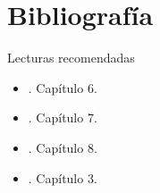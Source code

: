 \documentclass[9pt, aspectratio=169]{beamer}
\begin{document}
\section*{Bibliografía}
\begin{frame}[allowframebreaks]{Lecturas recomendadas}
\begin{itemize}
    \item {}. Capítulo 6.
    \item {}. Capítulo 7.
    \item {}. Capítulo 8.
    \item {}. Capítulo 3.
\end{itemize}
\end{frame}
\end{document}
